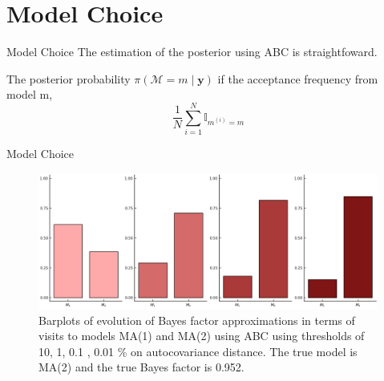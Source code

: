 \documentclass[10pt]{beamer}
\begin{document}
\section[Model Choice]{Model Choice}
\begin{frame}[fragile]{Model Choice}
  The estimation of the posterior using ABC is straightfoward.

  \begin{algorithm}[H]
  \SetAlgoLined
   \caption{ABC Model Choice}
  \end{algorithm}

  The posterior probability $\pi(\mathcal{M}=m \mid \bm y)$
  if the acceptance frequency from model m,
  $$
  \frac{1}{N}\sum^N_{i=1}\mathbb I_{m^{(i)}=m}
  $$


\end{frame}

\begin{frame}[fragile]{Model Choice}

    \begin{figure}[H]
        \centering
        \includegraphics[width=11.2cm]{images/ModelChoice_MA2.png}
        \caption{Barplots of evolution of Bayes factor approximations
        in terms of visits to models MA(1) and MA(2) using
        ABC using thresholds of 10, 1, 0.1 , 0.01 \% on autocovariance
        distance. The true model is MA(2) and the true Bayes factor is 0.952.
        }
    \end{figure}

\end{frame}
\end{document}

